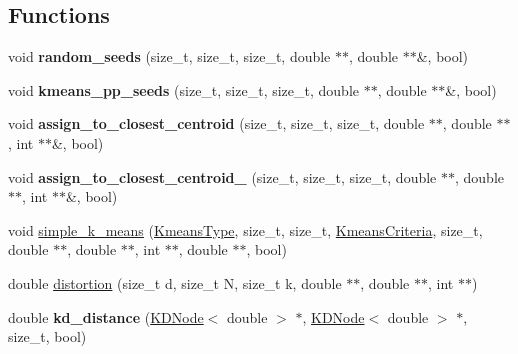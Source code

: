 \subsection*{Functions}
\begin{DoxyCompactItemize}
\item 
\hypertarget{namespaceSimpleCluster_aa3c1fa27364305d35f14eb0b6b984a10}{void {\bfseries random\-\_\-seeds} (size\-\_\-t, size\-\_\-t, size\-\_\-t, double $\ast$$\ast$, double $\ast$$\ast$\&, bool)}\label{namespaceSimpleCluster_aa3c1fa27364305d35f14eb0b6b984a10}

\item 
\hypertarget{namespaceSimpleCluster_ab1abfee692e0476f34c72ac18a68bf17}{void {\bfseries kmeans\-\_\-pp\-\_\-seeds} (size\-\_\-t, size\-\_\-t, size\-\_\-t, double $\ast$$\ast$, double $\ast$$\ast$\&, bool)}\label{namespaceSimpleCluster_ab1abfee692e0476f34c72ac18a68bf17}

\item 
\hypertarget{namespaceSimpleCluster_ab2891f2d63800fe4bfc4b99aaadb7f75}{void {\bfseries assign\-\_\-to\-\_\-closest\-\_\-centroid} (size\-\_\-t, size\-\_\-t, size\-\_\-t, double $\ast$$\ast$, double $\ast$$\ast$, int $\ast$$\ast$\&, bool)}\label{namespaceSimpleCluster_ab2891f2d63800fe4bfc4b99aaadb7f75}

\item 
\hypertarget{namespaceSimpleCluster_a9bbcb2b17eb235fac8b15e8a8283849e}{void {\bfseries assign\-\_\-to\-\_\-closest\-\_\-centroid\-\_} (size\-\_\-t, size\-\_\-t, size\-\_\-t, double $\ast$$\ast$, double $\ast$$\ast$, int $\ast$$\ast$\&, bool)}\label{namespaceSimpleCluster_a9bbcb2b17eb235fac8b15e8a8283849e}

\item 
void \hyperlink{namespaceSimpleCluster_a567aef9107b538f7866d782c292236af}{simple\-\_\-k\-\_\-means} (\hyperlink{namespaceSimpleCluster_a8a8f57121b69a7b43575e4d6a53928e2}{Kmeans\-Type}, size\-\_\-t, size\-\_\-t, \hyperlink{structSimpleCluster_1_1KmeansCriteria}{Kmeans\-Criteria}, size\-\_\-t, double $\ast$$\ast$, double $\ast$$\ast$, int $\ast$$\ast$, double $\ast$$\ast$, bool)
\item 
double \hyperlink{namespaceSimpleCluster_ac4e86e21df3609d069aac485d0d09b54}{distortion} (size\-\_\-t d, size\-\_\-t N, size\-\_\-t k, double $\ast$$\ast$, double $\ast$$\ast$, int $\ast$$\ast$)
\item 
\hypertarget{namespaceSimpleCluster_a35cd22686dbc96142da1962ac88caaed}{double {\bfseries kd\-\_\-distance} (\hyperlink{classSimpleCluster_1_1KDNode}{K\-D\-Node}$<$ double $>$ $\ast$, \hyperlink{classSimpleCluster_1_1KDNode}{K\-D\-Node}$<$ double $>$ $\ast$, size\-\_\-t, bool)}\label{namespaceSimpleCluster_a35cd22686dbc96142da1962ac88caaed}


\end{DoxyCompactItemize}
